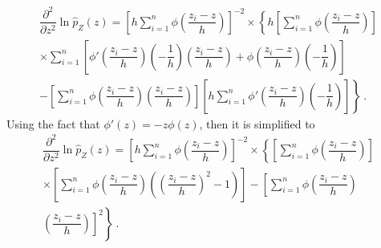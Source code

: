 \begin{multline*}
  \dfrac{
    \partial^2
  }
  {
    \partial z^2
  }
  \ln\widehat{p}_Z(z)
  =
  \left[
    h\sum_{i=1}^n
    \phi\left(
      \dfrac{
        z_i-z
      }
      {
        h
      }
    \right)
  \right]^{-2}
  \times
  \left\{
    h\left[
      \sum_{i=1}^n
      \phi\left(
        \dfrac{
          z_i-z
        }
        {
          h
        }
      \right)
    \right]
  \right.
  \\
  \left.
    \times
    \sum_{i=1}^n\left[
      \phi'\left(
        \dfrac{
          z_i-z
        }
        {
          h
        }
      \right)
      \left(
        -\dfrac{
          1
        }
        {
          h
        }
      \right)
      \left(
        \dfrac{
          z_i-z
        }
        {
          h
        }
      \right)
      +\phi\left(
        \dfrac{
          z_i-z
        }
        {
          h
        }
      \right)
      \left(
        -\dfrac{
          1
        }
        {
          h
        }
      \right)
    \right]
  \right.
  \\
  \left.
    -
    \left[
      \sum_{i=1}^n
      \phi\left(
        \dfrac{
          z_i-z
        }
        {
          h
        }
      \right)
      \left(
        \dfrac{
          z_i-z
        }
        {
          h
        }
      \right)
    \right]
    \left[
      h\sum_{i=1}^n
      \phi'\left(
        \dfrac{
          z_i-z
        }
        {
          h
        }
      \right)
      \left(
        -\dfrac{
          1
        }
        {
          h
        }
      \right)
    \right]
  \right\}
  \ .
\end{multline*}
Using the fact that $\phi'(z)=-z\phi(z)$, then it is simplified to
\begin{multline}
  \dfrac{
    \partial^2
  }
  {
    \partial z^2
  }
  \ln\widehat{p}_Z(z)
  =
  \left[
    h\sum_{i=1}^n
    \phi\left(
      \dfrac{
        z_i-z
      }
      {
        h
      }
    \right)
  \right]^{-2}
  \times
  \left\{
    \left[
      \sum_{i=1}^n
      \phi\left(
        \dfrac{
          z_i-z
        }
        {
          h
        }
      \right)
    \right]
  \right.
  \\
  \left.
    \times
    \left[
      \sum_{i=1}^n
      \phi\left(
        \dfrac{
          z_i-z
        }
        {
          h
        }
      \right)
      \left(
        \left(
          \dfrac{
            z_i-z
          }
          {
            h
          }
        \right)^2
        -1
      \right)
    \right]
    -
    \left[
      \sum_{i=1}^n
      \phi\left(
        \dfrac{
          z_i-z
        }
        {
          h
        }
      \right)
    \right.
  \right.
  \\
  \left.
    \left.
      \left(
        \dfrac{
          z_i-z
        }
        {
          h
        }
      \right)
    \right]^2
  \right\}
  \ .
\end{multline}

